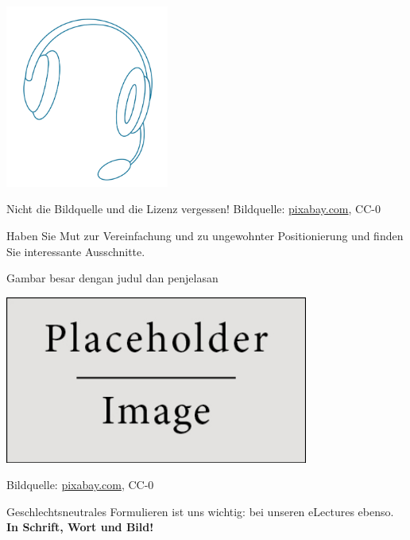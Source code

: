 \documentclass[main.tex]{subfiles}
\begin{document}
\begin{frame}
	\begin{center}
		\includegraphics[height=6cm]{figures/kopfhoerer}

		{\tiny \textcolor{digiPH_darkorange}{Nicht die Bildquelle und die Lizenz vergessen! Bildquelle: \url{pixabay.com}, CC-0}}
	\end{center}
	\begin{center}
		Haben Sie Mut zur Vereinfachung und zu ungewohnter Positionierung und finden Sie interessante Ausschnitte.
	\end{center}
\end{frame}

\begin{frame}{Gambar besar dengan judul dan penjelasan}
	\begin{center}
		\includegraphics[height=5.5cm]{figures/placeholder}

		{\tiny \textcolor{digiPH_darkorange}{Bildquelle: \url{pixabay.com}, CC-0}}
	\end{center}
	\begin{center}
		Geschlechtsneutrales Formulieren ist uns wichtig: bei unseren eLectures ebenso. \textbf{In Schrift, Wort und Bild!}
	\end{center}
\end{frame}
\end{document}
